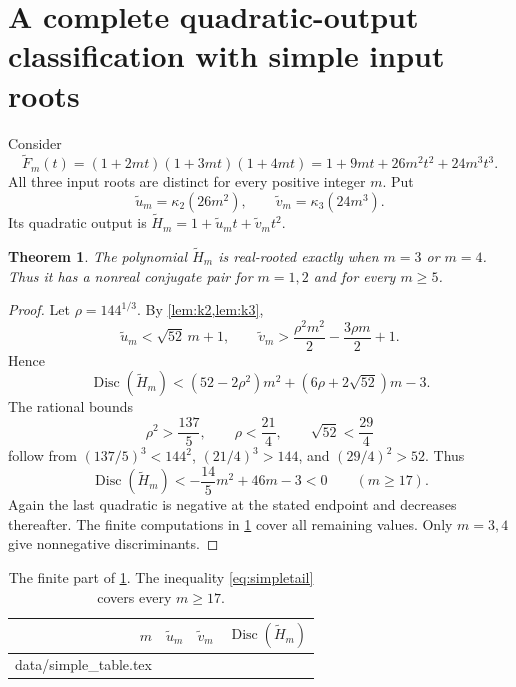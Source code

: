 \documentclass[11pt,letterpaper]{article}
\makeatletter
\let\tableinput\@@input
\numberwithin{equation}{section}
\newtheorem{theorem}{Theorem}[section]
\theoremstyle{definition}
\theoremstyle{remark}
\newcommand{\kap}{\kappa}
\newcommand{\Disc}{\operatorname{Disc}}
\makeatother
\begin{document}
\section{A complete quadratic-output classification with simple input roots}
\label{sec:simplefamily}

Consider
\begin{equation}\label{eq:simplefamily}
 \widetilde F_m(t)=(1+2mt)(1+3mt)(1+4mt)
                  =1+9mt+26m^2t^2+24m^3t^3.
\end{equation}
All three input roots are distinct for every positive integer $m$. Put
\[
 \widetilde u_m=\kap_2(26m^2),\qquad
 \widetilde v_m=\kap_3(24m^3).
\]
Its quadratic output is
$\widetilde H_m=1+\widetilde u_mt+\widetilde v_mt^2$.

\begin{theorem}\label{thm:simplefamily}
The polynomial $\widetilde H_m$ is real-rooted exactly when $m=3$ or $m=4$.
Thus it has a nonreal conjugate pair for $m=1,2$ and for every $m\ge5$.
\end{theorem}
\begin{proof}
Let $\rho=144^{1/3}$. By \cref{lem:k2,lem:k3},
\[
 \widetilde u_m<\sqrt{52}\,m+1,\qquad
 \widetilde v_m>\frac{\rho^2m^2}{2}-\frac{3\rho m}{2}+1.
\]
Hence
\[
 \Disc(\widetilde H_m)
 <(52-2\rho^2)m^2+(6\rho+2\sqrt{52})m-3.
\]
The rational bounds
\[
 \rho^2>\frac{137}{5},\qquad
 \rho<\frac{21}{4},\qquad
 \sqrt{52}<\frac{29}{4}
\]
follow from $(137/5)^3<144^2$, $(21/4)^3>144$, and $(29/4)^2>52$.
Thus
\begin{equation}\label{eq:simpletail}
 \Disc(\widetilde H_m)<-\frac{14}{5}m^2+46m-3<0
 \qquad(m\ge17).
\end{equation}
Again the last quadratic is negative at the stated endpoint and decreases
thereafter. The finite computations in \cref{tab:simple} cover all
remaining values. Only $m=3,4$ give nonnegative discriminants.
\end{proof}

\begin{table}[htbp]
\centering
\small
\begin{tabular}{@{}rrrr@{}}
\toprule
$m$ & $\widetilde u_m$ & $\widetilde v_m$ & $\Disc(\widetilde H_m)$\\
\midrule
\tableinput data/simple_table.tex
\bottomrule
\end{tabular}
\caption{The finite part of \cref{thm:simplefamily}. The inequality
\eqref{eq:simpletail} covers every $m\ge17$.}
\label{tab:simple}
\end{table}
\end{document}
